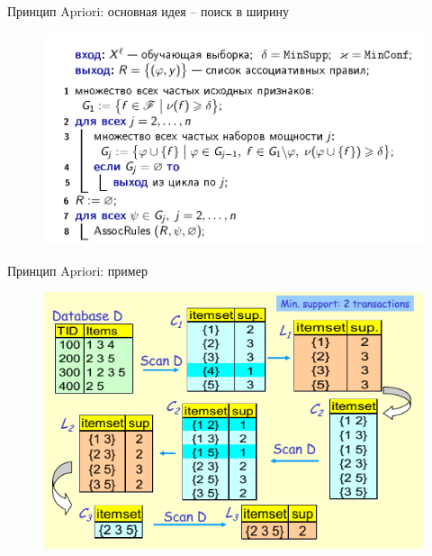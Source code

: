 \documentclass{beamer}
\begin{document}
\begin{frame}{Принцип Apriori: основная идея -- поиск в ширину}
	\begin{figure}[h]
		\centering
		\includegraphics[scale=0.5]{images/lec08-pic12.png}
	\end{figure}
\end{frame}

\begin{frame}{Принцип Apriori: пример}
	\begin{figure}[h]
		\centering
		\includegraphics[scale=0.75]{images/lec08-pic13.png}
	\end{figure}
\end{frame}
\end{document}
